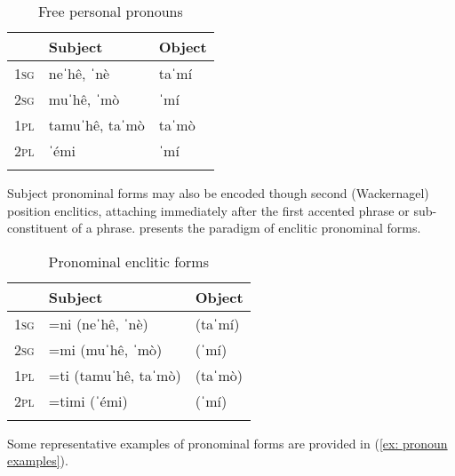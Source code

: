 \begin{table}
\caption{Free personal pronouns}
\label{tab:pronouns}

\begin{tabularx}{.5\textwidth}{lll}
\lsptoprule
& \textbf{Subject} & \textbf{Object}\\
\midrule
 \textsc{1sg} & neˈhê, ˈnè & taˈmí\\
 \textsc{2sg} & muˈhê, ˈmò & ˈmí\\
 \textsc{1pl} & tamuˈhê, taˈmò & taˈmò\\
 \textsc{2pl} & ˈémi & ˈmí\\
\lspbottomrule
\end{tabularx}
\end{table}


Subject pronominal forms may also be encoded though second (Wackernagel) position enclitics, attaching immediately after the first accented phrase or sub-constituent of a phrase.  presents the paradigm of enclitic pronominal forms.

\begin{table}
\caption{Pronominal enclitic forms}
\label{tab:enclitics}

\begin{tabularx}{.5\textwidth}{lll}
\lsptoprule
& \textbf{Subject} & \textbf{Object}\\
\midrule
 \textsc{1sg} & =ni (neˈhê, ˈnè) & (taˈmí)\\
 \textsc{2sg} & =mi (muˈhê, ˈmò) & (ˈmí)\\
 \textsc{1pl} & =ti (tamuˈhê, taˈmò) & (taˈmò)\\
 \textsc{2pl} & =timi (ˈémi) & (ˈmí)\\
\lspbottomrule
\end{tabularx}
\end{table}

Some representative examples of pronominal forms are provided in (\ref{ex: pronoun examples}).

\ea\label{ex: pronoun examples}

